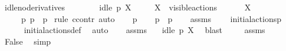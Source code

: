 \begin{isabellebody}
\ idle{\isacharunderscore}{\kern0pt}no{\isacharunderscore}{\kern0pt}derivatives{\isacharcolon}{\kern0pt}\isanewline
\ \ \ \isanewline
\ \ \ \ {\isacartoucheopen}idle\ p\ X{\isacartoucheclose}\ \isanewline
\ \ \ \ {\isacartoucheopen}X\ {\isasymsubseteq}\ visible{\isacharunderscore}{\kern0pt}actions{\isacartoucheclose}\isanewline
\ \ \ \ {\isacartoucheopen}{\isasymalpha}\ {\isasymin}\ X{\isasymunion}{\isacharbraceleft}{\kern0pt}{\isasymtau}{\isacharbraceright}{\kern0pt}{\isacartoucheclose}\isanewline
\ \ \isanewline
\ \ \ \ {\isacartoucheopen}{\isasymnexists}\ p{\isacharprime}{\kern0pt}{\isachardot}{\kern0pt}\ p\ {\isasymlongmapsto}{\isasymalpha}\ p{\isacharprime}{\kern0pt}{\isacartoucheclose}\isanewline
%
\isadelimproof
%
\endisadelimproof
%
\isatagproof
{}\isamarkupfalse%
\ {\isacharparenleft}{\kern0pt}rule\ ccontr{\isacharcomma}{\kern0pt}\ auto{\isacharparenright}{\kern0pt}\isanewline
\ \ \isamarkupfalse%
\ p{\isacharprime}{\kern0pt}\isanewline
\ \ \isamarkupfalse%
\ {\isacartoucheopen}p\ {\isasymlongmapsto}{\isasymalpha}\ p{\isacharprime}{\kern0pt}{\isacartoucheclose}\isanewline
\ \ \isamarkupfalse%
\ assms{\isacharparenleft}{\kern0pt}{}{\isacharcomma}{\kern0pt}{}{\isacharparenright}{\kern0pt}\ \isamarkupfalse%
\ {\isacartoucheopen}{\isasymalpha}\ {\isasymin}\ initial{\isacharunderscore}{\kern0pt}actions{\isacharparenleft}{\kern0pt}p{\isacharparenright}{\kern0pt}{\isacartoucheclose}\isanewline
\ \ \ \ \isamarkupfalse%
\ initial{\isacharunderscore}{\kern0pt}actions{\isacharunderscore}{\kern0pt}def\ \isamarkupfalse%
\ auto\isanewline
\ \ \isamarkupfalse%
\ assms{\isacharparenleft}{\kern0pt}{}{\isacharparenright}{\kern0pt}\ \isamarkupfalse%
\ {\isacartoucheopen}{\isasymnot}\ idle\ p\ X{\isacartoucheclose}\ \isamarkupfalse%
\ blast\ \isanewline
\ \ \isamarkupfalse%
\ assms{\isacharparenleft}{\kern0pt}{}{\isacharparenright}{\kern0pt}\ \isamarkupfalse%
\ False\ \isamarkupfalse%
\ simp\isanewline
{}\isamarkupfalse%
%
\endisatagproof
{\isafoldproof}%
%
\isadelimproof
\isanewline
%
\endisadelimproof
\isanewline
{}\isamarkupfalse%
\ %
%
\isadelimtheory
%
\endisadelimtheory
%
\isatagtheory
%
\endisatagtheory
{\isafoldtheory}%
%
\isadelimtheory
%
\endisadelimtheory
%
\end{isabellebody}%
